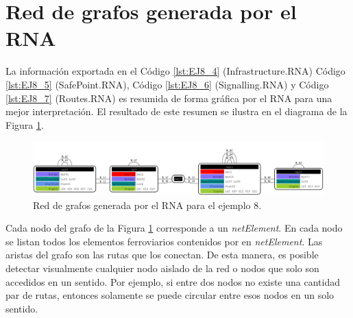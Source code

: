 \section{Red de grafos generada por el RNA}

	 La información exportada en el Código \ref{lst:EJ8_4} (Infrastructure.RNA) Código \ref{lst:EJ8_5} (SafePoint.RNA), Código \ref{lst:EJ8_6} (Signalling.RNA) y Código \ref{lst:EJ8_7} (Routes.RNA) es resumida de forma gráfica por el RNA para una mejor interpretación. El resultado de este resumen se ilustra en el diagrama de la Figura \ref{fig:EJ8_8}.

	\begin{figure}[H]
		\centering
		\includegraphics[width=1\textwidth]{Figuras/Graph_8}
		\centering\caption{Red de grafos generada por el RNA para el ejemplo 8.}
		\label{fig:EJ8_8}
	\end{figure}
	
	Cada nodo del grafo de la Figura \ref{fig:EJ8_8} corresponde a un \textit{netElement}. En cada nodo se listan todos los elementos ferroviarios contenidos por en \textit{netElement}. Las aristas del grafo son las rutas que los conectan. De esta manera, es posible detectar visualmente cualquier nodo aislado de la red o nodos que solo son accedidos en un sentido. Por ejemplo, si entre dos nodos no existe una cantidad par de rutas, entonces solamente se puede circular entre esos nodos en un solo sentido.